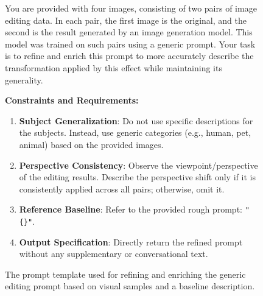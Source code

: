 \begin{figure}[htbp]
\centering
\begin{tcolorbox}[
    colback=gray!5!white,
    colframe=gray!60!black,
    title=\textbf{Prompt for AAC},
    fonttitle=\sffamily\bfseries,
    boxrule=0.8pt,
    arc=3pt,
    left=8pt, right=8pt, top=8pt, bottom=8pt
]
\small

You are provided with four images, consisting of two pairs of image editing data. In each pair, the first image is the original, and the second is the result generated by an image generation model. This model was trained on such pairs using a generic prompt. Your task is to refine and enrich this prompt to more accurately describe the transformation applied by this effect while maintaining its generality.

\vspace{0.5em}
\noindent\textbf{Constraints and Requirements:}
\begin{enumerate}
    \item \textbf{Subject Generalization}: Do not use specific descriptions for the subjects. Instead, use generic categories (e.g., human, pet, animal) based on the provided images.
    \item \textbf{Perspective Consistency}: Observe the viewpoint/perspective of the editing results. Describe the perspective shift only if it is consistently applied across all pairs; otherwise, omit it.
    \item \textbf{Reference Baseline}: Refer to the provided rough prompt: \texttt{"\{\}"}.
    \item \textbf{Output Specification}: Directly return the refined prompt without any supplementary or conversational text.
\end{enumerate}

\end{tcolorbox}
\caption{The prompt template used for refining and enriching the generic editing prompt based on visual samples and a baseline description.}
\label{fig:aac_prompt}
\end{figure}